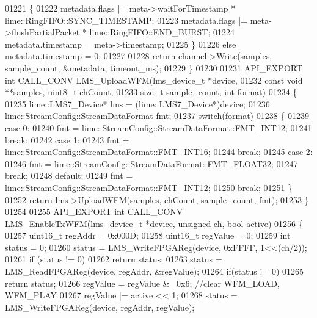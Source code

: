 \begin{DoxyCode}
01221     \{
01222         metadata.flags |= meta->waitForTimestamp * 
      lime::RingFIFO::SYNC_TIMESTAMP;
01223         metadata.flags |= meta->flushPartialPacket * lime::RingFIFO::END_BURST;
01224         metadata.timestamp = meta->timestamp;
01225     \}
01226     \textcolor{keywordflow}{else} metadata.timestamp = 0;
01227 
01228     \textcolor{keywordflow}{return} channel->Write(samples, sample\_count, &metadata, timeout\_ms);
01229 \}
01230 
01231 API_EXPORT \textcolor{keywordtype}{int} CALL_CONV LMS_UploadWFM(lms_device_t *device,
01232                                          \textcolor{keyword}{const} \textcolor{keywordtype}{void} **samples, uint8\_t chCount,
01233                                          \textcolor{keywordtype}{size\_t} sample_count, \textcolor{keywordtype}{int} format)
01234 \{
01235     lime::LMS7_Device* lms = (lime::LMS7_Device*)device;
01236     lime::StreamConfig::StreamDataFormat fmt;
01237     \textcolor{keywordflow}{switch}(format)
01238     \{
01239         \textcolor{keywordflow}{case} 0:
01240             fmt = lime::StreamConfig::StreamDataFormat::FMT\_INT12;
01241             \textcolor{keywordflow}{break};
01242         \textcolor{keywordflow}{case} 1:
01243             fmt = lime::StreamConfig::StreamDataFormat::FMT\_INT16;
01244             \textcolor{keywordflow}{break};
01245         \textcolor{keywordflow}{case} 2:
01246             fmt = lime::StreamConfig::StreamDataFormat::FMT\_FLOAT32;
01247             \textcolor{keywordflow}{break};
01248         \textcolor{keywordflow}{default}:
01249             fmt = lime::StreamConfig::StreamDataFormat::FMT\_INT12;
01250             \textcolor{keywordflow}{break};
01251     \}
01252     \textcolor{keywordflow}{return} lms->UploadWFM(samples, chCount, sample\_count, fmt);
01253 \}
01254 
01255 API_EXPORT \textcolor{keywordtype}{int} CALL_CONV LMS_EnableTxWFM(lms_device_t *device, \textcolor{keywordtype}{unsigned} ch, \textcolor{keywordtype}{bool} 
      active)
01256 \{
01257     uint16\_t regAddr = 0x000D;
01258     uint16\_t regValue = 0;
01259     \textcolor{keywordtype}{int} status = 0;
01260     status = LMS_WriteFPGAReg(device, 0xFFFF, 1<<(ch/2));
01261     \textcolor{keywordflow}{if} (status != 0)
01262         \textcolor{keywordflow}{return} status;
01263     status = LMS_ReadFPGAReg(device, regAddr, &regValue);
01264     \textcolor{keywordflow}{if}(status != 0)
01265         \textcolor{keywordflow}{return} status;
01266     regValue = regValue & ~0x6; \textcolor{comment}{//clear WFM\_LOAD, WFM\_PLAY}
01267     regValue |= active << 1;
01268     status = LMS_WriteFPGAReg(device, regAddr, regValue);

\end{DoxyCode}
